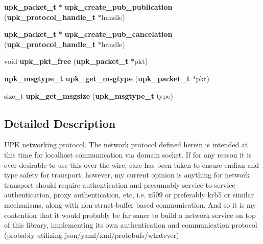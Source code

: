\begin{DoxyCompactItemize}
{\bf upk\_\-packet\_\-t} $\ast$ {\bf upk\_\-create\_\-pub\_\-publication} ({\bf upk\_\-protocol\_\-handle\_\-t} $\ast$handle)
\item 
{\bf upk\_\-packet\_\-t} $\ast$ {\bf upk\_\-create\_\-pub\_\-cancelation} ({\bf upk\_\-protocol\_\-handle\_\-t} $\ast$handle)
\item 
void {\bf upk\_\-pkt\_\-free} ({\bf upk\_\-packet\_\-t} $\ast$pkt)
\item 
{\bf upk\_\-msgtype\_\-t} {\bf upk\_\-get\_\-msgtype} ({\bf upk\_\-packet\_\-t} $\ast$pkt)
\item 
size\_\-t {\bf upk\_\-get\_\-msgsize} ({\bf upk\_\-msgtype\_\-t} type)
\end{DoxyCompactItemize}


\subsection{Detailed Description}
UPK networking protocol. The network protocol defined herein is intended at this time for localhost communication via domain socket. If for any reason it is ever desirable to use this over the wire, care has been taken to ensure endian and type safety for transport; however, my current opinion is anything for network transport should require authentication and presumably service-\/to-\/service authentication, proxy authentication, etc, i.e. x509 or preferably krb5 or similar mechanisms, along with non-\/struct-\/buffer based communication. And so it is my contention that it would probably be far saner to build a network service on top of this library, implementing its own authentication and communication protocol (probably utilizing json/yaml/xml/protobufs/whatever) 